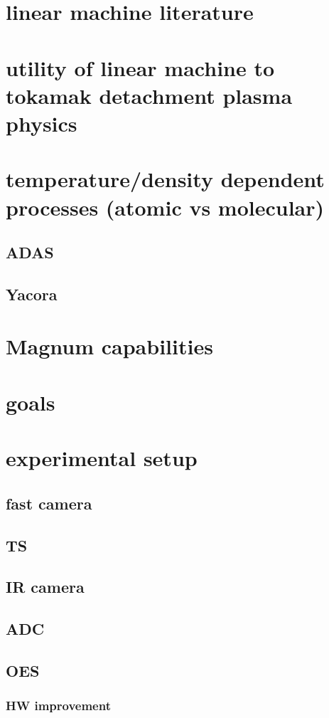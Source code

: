\section{linear machine literature}
\section{utility of linear machine to tokamak detachment plasma physics}
\section{temperature/density dependent processes (atomic vs molecular)}
\subsection{ADAS}
\subsection{Yacora}
\section{Magnum capabilities}
\section{goals}
\section{experimental setup}
\subsection{fast camera}
\subsection{TS}
\subsection{IR camera}
\subsection{ADC}
\subsection{OES}
\subsubsection{HW improvement}
